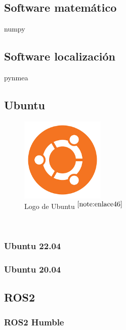 \subsection{Software matemático}

numpy

\subsection{Software localización}
pynmea

\subsection{Ubuntu}

\begin{figure} [h!]
	\begin{center}
		\includegraphics[width=4cm]{figs/ubuntu.png}
	\end{center}
	\caption{Logo de Ubuntu $^{\ref{note:enlace46}}$} 
	\label{fig:ubuntu}
\end{figure}\

\setcounter{footnote}{46} %

\subsubsection{Ubuntu 22.04}

\subsubsection{Ubuntu 20.04}


\subsection{ROS2}


\subsubsection{ROS2 Humble}

